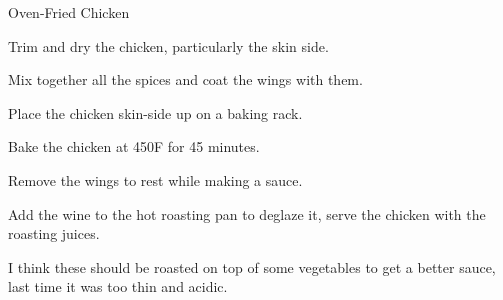 \documentclass{recipe}
\begin{document}
\begin{recipe}{Oven-Fried Chicken}

  \begin{ingredients}
  \end{ingredients}

  \begin{steps}
  \item Trim and dry the chicken, particularly the skin side.
  \item Mix together all the spices and coat the wings with them.
  \item Place the chicken skin-side up on a baking rack.
  \item Bake the chicken at 450\degree F for 45 minutes.
  \item Remove the wings to rest while making a sauce.
  \item Add the wine to the hot roasting pan to deglaze it, serve the
    chicken with the roasting juices.
  \end{steps}

  \begin{notes}
  \item I think these should be roasted on top of some vegetables to
    get a better sauce, last time it was too thin and acidic.
  \end{notes}
\end{recipe}
\end{document}
